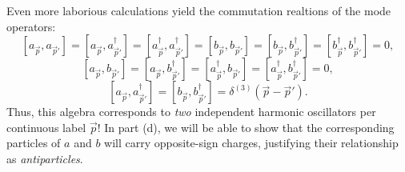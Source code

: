 \documentclass[11pt]{article}
\begin{document}
Even more laborious calculations yield the commutation realtions of the mode operators:
\[
    [a_{\vec{p}},a_{\vec{p}'}] = [a_{\vec{p}},a_{\vec{p}'}^\dagger]
    = [a_{\vec{p}}^\dagger,a_{\vec{p}'}^\dagger]
    = [b_{\vec{p}},b_{\vec{p}'}] = [b_{\vec{p}},b_{\vec{p}'}^\dagger]
    = [b_{\vec{p}}^\dagger,b_{\vec{p}'}^\dagger]
    = 0,
\]
\[
    [a_{\vec{p}},b_{\vec{p}'}] = [a_{\vec{p}},b_{\vec{p}'}^\dagger]
    = [a_{\vec{p}}^\dagger,b_{\vec{p}'}] = [a_{\vec{p}}^\dagger,b_{\vec{p}'}^\dagger]
    = 0,
\]
\[
    [a_{\vec{p}},a_{\vec{p}'}^\dagger] = [b_{\vec{p}},b_{\vec{p}'}^\dagger]
    = \delta^{(3)}(\vec{p} - \vec{p}').
\]
Thus, this algebra corresponds to \emph{two} independent harmonic oscillators per continuous label $\vec{p}$!
In part (d), we will be able to show that the corresponding particles of $a$ and $b$
will carry opposite-sign charges,
justifying their relationship as \emph{antiparticles}.
\end{document}
